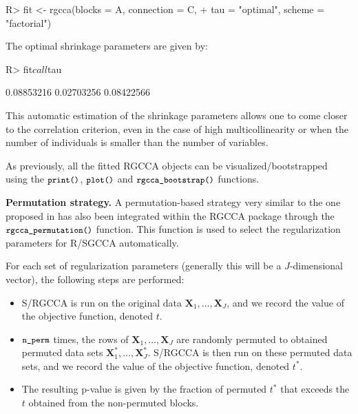 \documentclass[
]{jss}
\begin{document}
\footnotesize

\begin{CodeChunk}
\begin{CodeInput}
R> fit <- rgcca(blocks = A, connection = C,
+              tau = "optimal", scheme = "factorial")
\end{CodeInput}
\end{CodeChunk}

\normalsize

The optimal shrinkage parameters are given by:

\footnotesize

\begin{CodeChunk}
\begin{CodeInput}
R> fit$call$tau
\end{CodeInput}
\begin{CodeOutput}
[1] 0.08853216 0.02703256 0.08422566
\end{CodeOutput}
\end{CodeChunk}

\normalsize

This automatic estimation of the shrinkage parameters allows one to come
closer to the correlation criterion, even in the case of high
multicollinearity or when the number of individuals is smaller than the
number of variables.

As previously, all the fitted RGCCA objects can be
visualized/bootstrapped using the \(\small{\texttt{print()}}\),
\(\small{\texttt{plot()}}\) and \(\small{\texttt{rgcca\_bootstrap()}}\)
functions.

\textbf{Permutation strategy.} A permutation-based strategy very similar
to the one proposed in \cite{Witten2009a} has also been integrated
within the RGCCA package through the
\(\small{\texttt{rgcca\_permutation()}}\) function. This function is
used to select the regularization parameters for R/SGCCA automatically.

For each set of regularization parameters (generally this will be a
\(J\)-dimensional vector), the following steps are performed:

\begin{itemize}
\item
  S/RGCCA is run on the original data
  \(\mathbf X_1, \ldots, \mathbf X_J\), and we record the value of the
  objective function, denoted \(t\).
\item
  \(\small{\texttt{n\_perm}}\) times, the rows of
  \(\mathbf X_1, \ldots, \mathbf X_J\) are randomly permuted to obtained
  permuted data sets \(\mathbf X_1^*, \ldots, \mathbf X_J^*\). S/RGCCA
  is then run on these permuted data sets, and we record the value of
  the objective function, denoted \(t^*\).
\item
  The resulting p-value is given by the fraction of permuted \(t^*\)
  that exceeds the \(t\) obtained from the non-permuted blocks.
\end{itemize}
\end{document}

